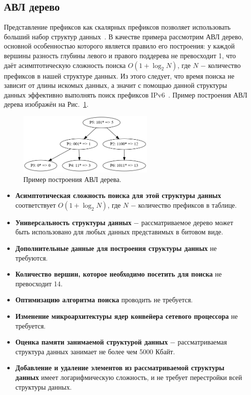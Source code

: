 \documentclass[a4paper, 12pt, titlepage, finall]{extreport}
\begin{document}
        \subsection{АВЛ дерево}
            \label{section:avlrev}
            Представление префиксов как скалярных префиксов позволяет использовать больший набор структур данных~\cite{behdadfar2009scalar}. 
            В качестве примера рассмотрим АВЛ дерево, основной особенностью которого является правило его построения: у каждой вершины разность 
            глубины левого и правого поддерева не превосходит 1, что даёт асимптотическую сложность поиска {\ttfamily $O(1+\log_2{N})$}, 
            где {\ttfamily $N$} $-$ количество префиксов в нашей структуре данных. Из этого следует, что время поиска не зависит от длины искомых данных,
            а значит с помощью данной структуры данных эффективно выполнять поиск префиксов IPv6~\cite{behdadfar2011coded}.
            Пример построения АВЛ дерева изображён на Рис.~\ref{fig:mesh5}.
            \\
            \begin{figure}[ht]
                \centering
                \includegraphics[width=0.6\textwidth]{avl_tree.png}
                \caption{Пример построения АВЛ дерева.}\label{fig:mesh5}
            \end{figure}
            \begin{itemize}
                \item\textbf{Асимптотическая сложность поиска для этой структуры данных} соответствует {\ttfamily $O(1 + \log_2{N})$},
                где {\ttfamily $N$} $-$ количество префиксов в таблице.
                \item\textbf{Универсальность структуры данных} $-$ рассматриваемое дерево может быть использовано для любых данных представимых в битовом виде.
                \item\textbf{Дополнительные данные для построения структуры данных} не требуются.
                \item\textbf{Количество вершин, которое необходимо посетить для поиска} не превосходит 14.
                \item\textbf{Оптимизацию алгоритма поиска} проводить не требуется.
                \item\textbf{Изменение микроархитектуры ядер конвейера сетевого процессора} не требуется.
                \item\textbf{Оценка памяти занимаемой структурой данных} $-$ рассматриваемая структура данных занимает не более чем 5000 Кбайт.
                \item\textbf{Добавление и удаление элементов из рассматриваемой структуры данных} имеет логарифмическую сложность, и не требует перестройки всей структуры данных.
            \end{itemize}
\end{document}
